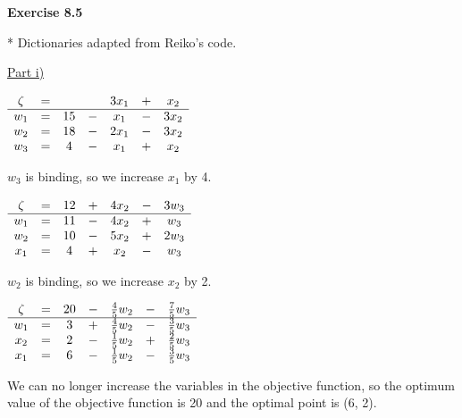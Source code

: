 \documentclass[letterpaper,12pt]{article}
\begin{document}
\textbf{Exercise 8.5}

* Dictionaries adapted from Reiko's code.

\underline{Part i)}

\begin{center}
	$\begin{array}{ c c c c c c c c  }
		\zeta & = & & & 3x_1 & + & x_2 \\
		\hline
		w_1 & = & 15 & - & x_1 & - & 3x_2 \\
		w_2 & = & 18 & - & 2x_1 & - & 3x_2 \\
		w_3 & = & 4 & - & x_1 & + & x_2 \\
	\end{array}$ \\
\end{center}

$w_3$ is binding, so we increase $x_1$ by 4. \\

\begin{center}
	$\begin{array}{ c c c c c c c c  }
		\zeta & = & 12 & + & 4x_2 & - & 3w_3 \\
		\hline
		w_1 & = & 11 & - & 4x_2 & + & w_3 \\
		w_2 & = & 10 & - & 5x_2 & + & 2w_3 \\
		x_1 & = & 4 & + & x_2 & - & w_3 \\
	\end{array}$ \\
\end{center}

$w_2$ is binding, so we increase $x_2$ by 2. \\

\begin{center}
	$\begin{array}{ c c c c c c c c  }
		\zeta & = & 20 & - & \tfrac{4}{5}w_2 & - & \tfrac{7}{5}w_3 \\
		\hline
		w_1 & = & 3 & + & \tfrac{4}{5}w_2 & - & \tfrac{3}{5}w_3 \\
		x_2 & = & 2 & - & \tfrac{1}{5}w_2 & + & \tfrac{2}{5}w_3 \\
		x_1 & = & 6 & - & \tfrac{1}{5}w_2 & - & \tfrac{3}{5}w_3\\
	\end{array}$
\end{center}

We can no longer increase the variables in the objective function, so the optimum value of the objective function is 20 and the optimal point is (6, 2).
\end{document}
